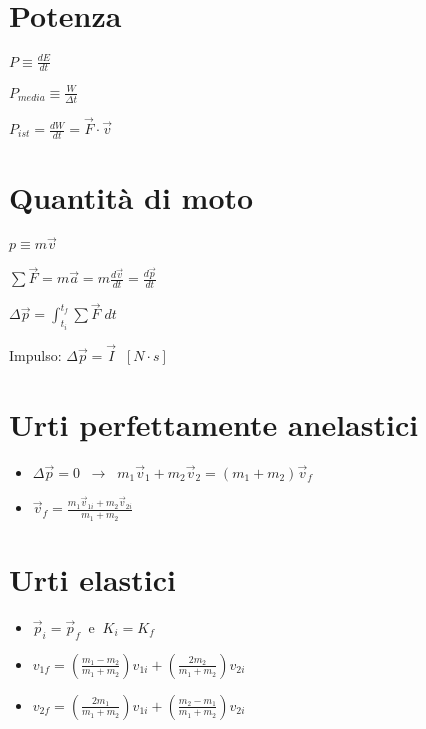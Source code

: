 \documentclass[a4paper,14pt,landscape]{extarticle}
\begin{document}
\begin{multicols*}{2}
    \section*{Potenza}
    \begin{itemize}
        \begin{multicols*}{3}
            \item $P \equiv \tfrac{dE}{dt}$
            \item $P_{media} \equiv \tfrac{W}{\Delta t}$
            \item $P_{ist} = \tfrac{dW}{dt} = \vec{F} \cdot \vec{v}$
        \end{multicols*}
    \end{itemize}

    \section*{Quantità di moto}
    \begin{itemize}
        \begin{multicols*}{2}
            \item $p \equiv m\vec{v}$
            \item $\sum \vec{F} = m\vec{a} = m \tfrac{d\vec{v}}{dt} = \tfrac{d\vec{p}}{dt}$
            \item $\Delta \vec{p} = \int_{t_i}^{t_f} \sum\vec{F} \; dt$
            \item Impulso: $\Delta \vec{p} = \vec{I} \;\; [N\cdot s]$          
        \end{multicols*}
    \end{itemize}

    \section*{Urti perfettamente anelastici}
    \begin{itemize}
        \item $\Delta \vec{p} = 0 \;\; \rightarrow \;\; m_1\vec{v}_1 + m_2\vec{v}_2 = (m_1+m_2)\vec{v}_f$
        \item $\vec{v}_f = \tfrac{m_1\vec{v}_{1i} + m_2\vec{v}_{2i}}{m_1 + m_2}$
    \end{itemize}

    \section*{Urti elastici}
    \begin{itemize}
        \item $\vec{p}_i = \vec{p}_f \;\; \text{e} \;\; K_i = K_f$
        \item $v_{1f} = \left( \tfrac{m_1 - m_2}{m_1 + m_2} \right) v_{1i} + \left( \tfrac{2m_2}{m_1 + m_2} \right) v_{2i}$
        \item $v_{2f} = \left( \tfrac{2m_1}{m_1 + m_2} \right) v_{1i} + \left( \tfrac{m_2 - m_1}{m_1 + m_2} \right) v_{2i}$
    \end{itemize}


\end{multicols*}
\end{document}

